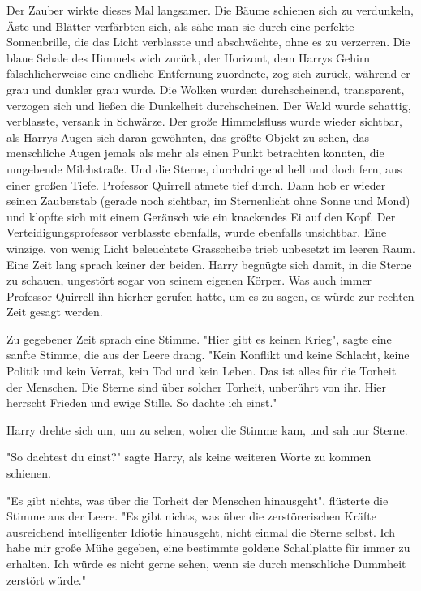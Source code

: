 {Der Zauber wirkte dieses Mal langsamer. Die Bäume schienen sich zu verdunkeln, Äste und Blätter verfärbten sich, als sähe man sie durch eine perfekte Sonnenbrille, die das Licht verblasste und abschwächte, ohne es zu verzerren. Die blaue Schale des Himmels wich zurück, der Horizont, dem Harrys Gehirn fälschlicherweise eine endliche Entfernung zuordnete, zog sich zurück, während er grau und dunkler grau wurde. Die Wolken wurden durchscheinend, transparent, verzogen sich und ließen die Dunkelheit durchscheinen. Der Wald wurde schattig, verblasste, versank in Schwärze. Der große Himmelsfluss wurde wieder sichtbar, als Harrys Augen sich daran gewöhnten, das größte Objekt zu sehen, das menschliche Augen jemals als mehr als einen Punkt betrachten konnten, die umgebende Milchstraße. Und die Sterne, durchdringend hell und doch fern, aus einer großen Tiefe. Professor Quirrell atmete tief durch. Dann hob er wieder seinen Zauberstab (gerade noch sichtbar, im Sternenlicht ohne Sonne und Mond) und klopfte sich mit einem Geräusch wie ein knackendes Ei auf den Kopf. Der Verteidigungsprofessor verblasste ebenfalls, wurde ebenfalls unsichtbar. Eine winzige, von wenig Licht beleuchtete Grasscheibe trieb unbesetzt im leeren Raum. Eine Zeit lang sprach keiner der beiden. Harry begnügte sich damit, in die Sterne zu schauen, ungestört sogar von seinem eigenen Körper. Was auch immer Professor Quirrell ihn hierher gerufen hatte, um es zu sagen, es würde zur rechten Zeit gesagt werden.

Zu gegebener Zeit sprach eine Stimme. "Hier gibt es keinen Krieg", sagte eine sanfte Stimme, die aus der Leere drang. "Kein Konflikt und keine Schlacht, keine Politik und kein Verrat, kein Tod und kein Leben. Das ist alles für die Torheit der Menschen. Die Sterne sind über solcher Torheit, unberührt von ihr. Hier herrscht Frieden und ewige Stille. So dachte ich einst."

Harry drehte sich um, um zu sehen, woher die Stimme kam, und sah nur Sterne.

"So dachtest du einst?" sagte Harry, als keine weiteren Worte zu kommen schienen.

"Es gibt nichts, was über die Torheit der Menschen hinausgeht", flüsterte die Stimme aus der Leere. "Es gibt nichts, was über die zerstörerischen Kräfte ausreichend intelligenter Idiotie hinausgeht, nicht einmal die Sterne selbst. Ich habe mir große Mühe gegeben, eine bestimmte goldene Schallplatte für immer zu erhalten. Ich würde es nicht gerne sehen, wenn sie durch menschliche Dummheit zerstört würde."

}
